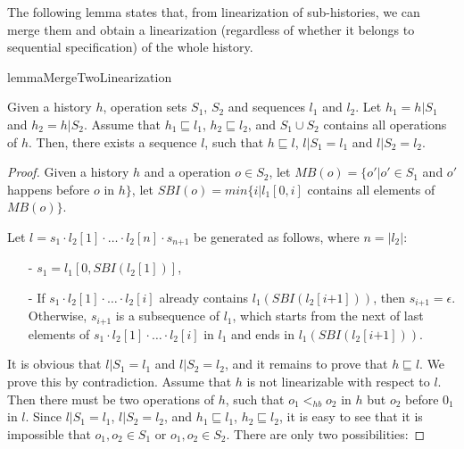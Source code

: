 The following lemma states that, from linearization of sub-histories, we can merge them and obtain a linearization (regardless of whether it belongs to sequential specification) of the whole history.

\begin{restatable}{lemma}{MergeTwoLinearization}
\label{lemma:merge two linearization}

Given a history $h$, operation sets $S_1$, $S_2$ and sequences $l_1$ and $l_2$. Let $h_1 = h \vert{S_1}$ and $h_2 = h \vert{S_2}$. Assume that $h_1 \sqsubseteq l_1$, $h_2 \sqsubseteq l_2$, and $S_1 \cup S_2$ contains all operations of $h$. Then, there exists a sequence $l$, such that $h \sqsubseteq l$, $l \vert{S_1} = l_1$ and $l \vert{S_2} = l_2$.
\end{restatable}

\begin {proof}

Given a history $h$ and a operation $o \in S_2$, let $\textit{MB}(o) = \{ o' \vert o' \in S_1$ and $o'$ happens before $o$ in $h \}$, let $\textit{SBI}(o) = \textit{min}\{ i \vert l_1[0,i]$ contains all elements of $\textit{MB}(o) \}$.

Let $l = s_1 \cdot l_2[1] \cdot \ldots \cdot l_2[n] \cdot s_{\textit{n+1}}$ be generated as follows, where $n = \vert l_2 \vert$:

\begin{itemize}
\setlength{\itemsep}{0.5pt}
\item[-] $s_1 = l_1[0, \textit{SBI}(l_2[1])]$,

\item[-] If $s_1 \cdot l_2[1] \cdot \ldots \cdot l_2[i]$ already contains $l_1(\textit{SBI}(l_2[\textit{i+1}]))$, then $s_{\textit{i+1}} = \epsilon$. Otherwise, $s_{\textit{i+1}}$ is a subsequence of $l_1$, which starts from the next of last elements of $s_1 \cdot l_2[1] \cdot \ldots \cdot l_2[i]$ in $l_1$ and ends in $l_1(\textit{SBI}(l_2[\textit{i+1}]))$.
\end{itemize}

It is obvious that $l \vert{S_1} = l_1$ and $l \vert{S_2} = l_2$, and it remains to prove that $h \sqsubseteq l$. We prove this by contradiction. Assume that $h$ is not linearizable with respect to $l$. Then there must be two operations of $h$, such that $o_1 <_{hb} o_2$ in $h$ but $o_2$ before $0_1$ in $l$. Since $l \vert{S_1} = l_1$, $l \vert{S_2} = l_2$, and $h_1 \sqsubseteq l_1$, $h_2 \sqsubseteq l_2$, it is easy to see that it is impossible that $o_1,o_2 \in S_1$ or $o_1,o_2 \in S_2$. There are only two possibilities:


\end{proof}
